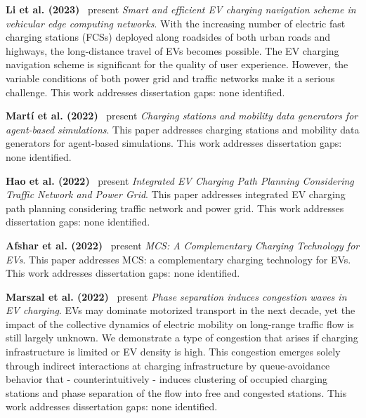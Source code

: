 \documentclass[letterpaper, 12pt, oneside, doublespacing]{Thesis}
\begin{document}
\noindent \textbf{Li et al. (2023)}~\cite{smart_and_2023} present \textit{Smart and efficient EV charging navigation scheme in vehicular edge computing networks}. With the increasing number of electric fast charging stations (FCSs) deployed along roadsides of both urban roads and highways, the long-distance travel of EVs becomes possible. The EV charging navigation scheme is significant for the quality of user experience. However, the variable conditions of both power grid and traffic networks make it a serious challenge. This work addresses dissertation gaps: none identified.



\noindent \textbf{Mart\'i et al. (2022)}~\cite{charging_stations_2022} present \textit{Charging stations and mobility data generators for agent-based simulations}. This paper addresses charging stations and mobility data generators for agent-based simulations. This work addresses dissertation gaps: none identified.



\noindent \textbf{Hao et al. (2022)}~\cite{integrated_electric_2022} present \textit{Integrated EV Charging Path Planning Considering Traffic Network and Power Grid}. This paper addresses integrated EV charging path planning considering traffic network and power grid. This work addresses dissertation gaps: none identified.



\noindent \textbf{Afshar et al. (2022)}~\cite{mobile_charging_2022} present \textit{MCS: A Complementary Charging Technology for EVs}. This paper addresses MCS: a complementary charging technology for EVs. This work addresses dissertation gaps: none identified.



\noindent \textbf{Marszal et al. (2022)}~\cite{phase_separation_2022} present \textit{Phase separation induces congestion waves in EV charging}. EVs may dominate motorized transport in the next decade, yet the impact of the collective dynamics of electric mobility on long-range traffic flow is still largely unknown. We demonstrate a type of congestion that arises if charging infrastructure is limited or EV density is high. This congestion emerges solely through indirect interactions at charging infrastructure by queue-avoidance behavior that - counterintuitively - induces clustering of occupied charging stations and phase separation of the flow into free and congested stations. This work addresses dissertation gaps: none identified.
\end{document}

